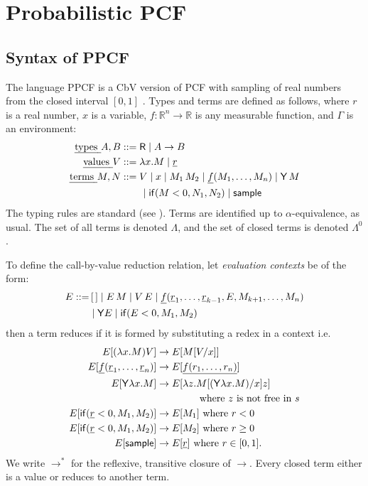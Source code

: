 \section{Probabilistic PCF}
\label{sec:PPCF}

\subsection{Syntax of PPCF}

The language PPCF is a CbV version of PCF with sampling of real numbers from the closed interval $[0,1]$ \cite{Ehrhard2018c,DBLP:journals/pacmpl/EhrhardPT18,MakOPW21}.
Types and terms are defined as follows, where $r$ is a real number, $x$ is a variable, $f : \mathbb{R}^n \to \mathbb{R}$ is any measurable function, and $\Gamma$ is an environment:
\begin{align*}
  \text{\em types } A, B &::= \textsf{R}  \mid  A \to B \\
  \text{\em values } V &::= \lambda x.M  \mid  \underline{r} \\
  \text{\em terms } M, N &::= V  \mid  x  \mid  M_1 \, M_2  \mid  \underline{f}(M_1,\dots ,M_n)  \mid  \mathsf{Y} \, M \\
   & \qquad \mid  \mathsf{if}(M < 0, N_1, N_2)  \mid  \mathsf{sample}
\end{align*}
The typing rules are standard (see ).
Terms are identified up to $\alpha$-equivalence, as usual. 
The set of all terms is denoted $\Lambda$, and the set of closed terms is denoted $\Lambda^0$.

To define the call-by-value reduction relation, let \emph{evaluation contexts} be of the form:
\begin{align*}
  E ::= & \, [\,] \mid E \, M \mid V \, E \mid \underline{f}(\underline r_1,\dots ,\underline r_{k-1}, E, M_{k+1}, \dots, M_n) \\ & \mid \mathsf{Y} E \mid \mathsf{if}(E<0, M_1, M_2)
\end{align*}
then a term reduces if it is formed by substituting a redex in a context i.e.
\begin{align*}
  E[(\lambda x.M) V] & \to E[M[V/x]] \\
  E[\underline f (\underline r_1, \dots , \underline r_n)] & \to E[\underline{f(r_1,\dots,r_n)}] \\
  E[\mathsf{Y} \lambda x. M] & \to E[\lambda z. M[(\mathsf{Y} \lambda x. M)/x] z] \\
  & \qquad \qquad \text{ where $z$ is not free in $s$}\\
  E[\mathsf{if}(\underline r < 0, M_1, M_2)] & \to E[M_1] \text{ where }r < 0 \\
  E[\mathsf{if}(\underline r < 0, M_1, M_2)] & \to E[M_2] \text{ where }r \geq 0 \\
  E[\mathsf{sample}] & \to E[\underline r] \text{ where } r \in [0,1].
\end{align*}
We write $\to^\ast$ for the reflexive, transitive closure of $\to$.
Every closed term either is a value or reduces to another term.

